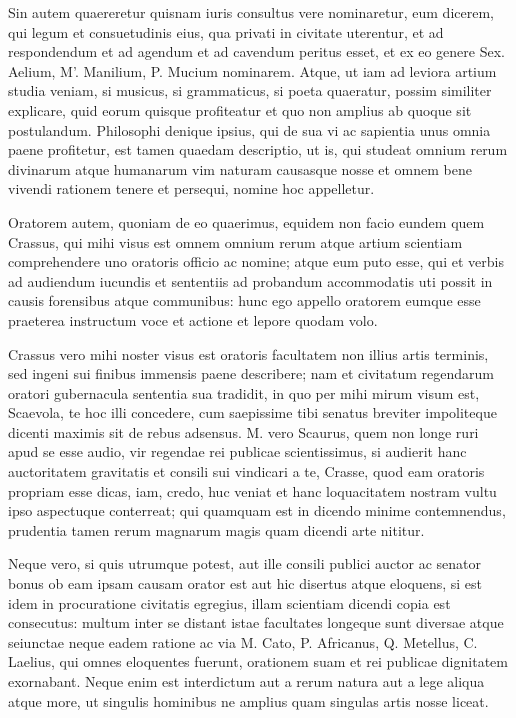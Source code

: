  Sin autem quaereretur quisnam iuris consultus vere nominaretur, eum dicerem, qui legum et consuetudinis eius, qua privati in civitate uterentur, et ad respondendum et ad agendum et ad cavendum peritus esset, et ex eo genere Sex. Aelium, M'. Manilium, P. Mucium nominarem. Atque, ut iam ad leviora artium studia veniam, si musicus, si grammaticus, si poeta quaeratur, possim similiter explicare, quid eorum quisque profiteatur et quo non amplius ab quoque sit postulandum. Philosophi denique ipsius, qui de sua vi ac sapientia unus omnia paene profitetur, est tamen quaedam descriptio, ut is, qui studeat omnium rerum divinarum atque humanarum vim naturam causasque nosse et omnem bene vivendi rationem tenere et persequi, nomine hoc appelletur.

 Oratorem autem, quoniam de eo quaerimus, equidem non facio eundem quem Crassus, qui mihi visus est omnem omnium rerum atque artium scientiam comprehendere uno oratoris officio ac nomine; atque eum puto esse, qui et verbis ad audiendum iucundis et sententiis ad probandum accommodatis uti possit in causis forensibus atque communibus: hunc ego appello oratorem eumque esse praeterea instructum voce et actione et lepore quodam volo.

 Crassus vero mihi noster visus est oratoris facultatem non illius artis terminis, sed ingeni sui finibus immensis paene describere; nam et civitatum regendarum oratori gubernacula sententia sua tradidit, in quo per mihi mirum visum est, Scaevola, te hoc illi concedere, cum saepissime tibi senatus breviter impoliteque dicenti maximis sit de rebus adsensus. M. vero Scaurus, quem non longe ruri apud se esse audio, vir regendae rei publicae scientissimus, si audierit hanc auctoritatem gravitatis et consili sui vindicari a te, Crasse, quod eam oratoris propriam esse dicas, iam, credo, huc veniat et hanc loquacitatem nostram vultu ipso aspectuque conterreat; qui quamquam est in dicendo minime contemnendus, prudentia tamen rerum magnarum magis quam dicendi arte nititur.

 Neque vero, si quis utrumque potest, aut ille consili publici auctor ac senator bonus ob eam ipsam causam orator est aut hic disertus atque eloquens, si est idem in procuratione civitatis egregius, illam scientiam dicendi copia est consecutus: multum inter se distant istae facultates longeque sunt diversae atque seiunctae neque eadem ratione ac via M. Cato, P. Africanus, Q. Metellus, C. Laelius, qui omnes eloquentes fuerunt, orationem suam et rei publicae dignitatem exornabant. Neque enim est interdictum aut a rerum natura aut a lege aliqua atque more, ut singulis hominibus ne amplius quam singulas artis nosse liceat.

